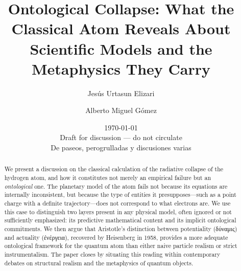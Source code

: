 \documentclass[11pt]{article}
\title{\textbf{Ontological Collapse: What the Classical Atom Reveals About Scientific Models and the Metaphysics They Carry}}
\author[1]{Jes\'{u}s Urtasun Elizari}
\author[2]{Alberto Miguel G\'{o}mez}
\affil[1]{\small MRC LMS, Imperial College London,
          \texttt{jurtasun@imperial.ac.uk}}
\affil[2]{\small Departamento, Universidad,
          \texttt{email@institucion.ac.uk}}
\date{\today \\ \small Draft for discussion --- do not circulate \\ De paseos, perogrulladas y discusiones varias}
\begin{document}
\maketitle

\begin{abstract}
We present a discussion on the classical calculation of the radiative collapse of the hydrogen atom, and how it constitutes not merely an empirical failure but an \emph{ontological} one. 
The planetary model of the atom fails not because its equations are internally inconsistent, but because the type of entities it presupposes---such as a point charge with a definite trajectory---does not correspond to what electrons are. 
We use this case to distinguish two layers present in any physical model, often ignored or not sufficiently emphasized: its predictive mathematical content and its implicit ontological commitments. 
We then argue that Aristotle's distinction between potentiality (\textgreek{δύναμις}) and actuality (\textgreek{ἐνέργεια}), recovered by Heisenberg in 1958, provides a more adequate ontological framework for the quantum atom than either naive particle realism or strict instrumentalism. 
The paper closes by situating this reading within contemporary debates on structural realism and the metaphysics of quantum objects.
\end{abstract}








\appendix



\end{document}
